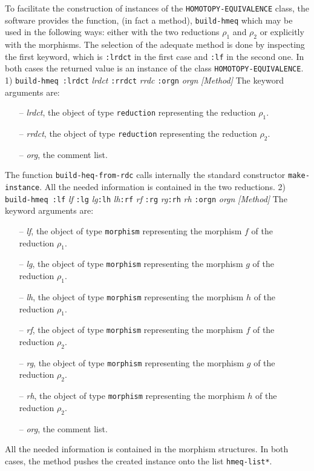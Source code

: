 To facilitate the construction of instances of the
{\tt HOMOTOPY-EQUIVALENCE} class, the software provides the function, (in fact a method),  {\tt build-hmeq}
which may be used in the following ways:
either with the two reductions $\rho_1$ and $\rho_2$ or explicitly with the morphisms.
The selection of the adequate method is done by inspecting the first keyword, which is
{\tt :lrdct} in the first case and {\tt :lf} in the second one. In both cases
the returned value is an instance of the class {\tt HOMOTOPY-EQUIVALENCE}.
\vskip 0.35cm
1) {\tt build-hmeq :lrdct} {\em lrdct} {\tt :rrdct} {\em rrdc} {\tt :orgn} {\em orgn} \hfill {\em [Method]}
\vskip 0.35cm
The keyword arguments are:
\begin{itemize}
\item[--] {\em lrdct}, the object of type {\tt reduction}  representing the reduction $\rho_1$.
\item[--] {\em rrdct}, the object of type {\tt reduction}  representing the reduction $\rho_2$.
\item[--] {\em org}, the comment list.
\end{itemize}
The function {\tt build-heq-from-rdc} calls internally the standard constructor {\tt make-instance}.
All the needed information is contained in the two reductions.
\vskip 0.35cm
2) {\tt build-hmeq :lf} {\em lf} {\tt :lg} {\em lg}{\tt :lh} {\em lh}{\tt :rf} {\em rf}
                             {\tt :rg} {\em rg}{\tt :rh} {\em rh} {\tt :orgn} {\em orgn} \hfill {\em [Method]}
\vskip 0.35cm
The keyword arguments are:
\begin{itemize}
\item[--] {\em lf}, the  object of type {\tt morphism}  representing the morphism $f$ of the reduction $\rho_1$.
\item[--] {\em lg}, the  object of type {\tt morphism}  representing the morphism $g$ of the reduction $\rho_1$.
\item[--] {\em lh}, the object of type  {\tt morphism}  representing the morphism $h$ of the reduction $\rho_1$.
\item[--] {\em rf}, the object of type {\tt morphism}   representing the morphism $f$ of the reduction $\rho_2$.
\item[--] {\em rg}, the object of type {\tt morphism}   representing the morphism $g$ of the reduction $\rho_2$.
\item[--] {\em rh}, the object of type {\tt morphism}   representing the morphism $h$ of the reduction $\rho_2$.
\item[--] {\em org}, the comment list.
\end{itemize}
All the needed information is contained in the morphism structures.
In both cases, the method  pushes the created instance onto the list {\tt *hmeq-list*}.

